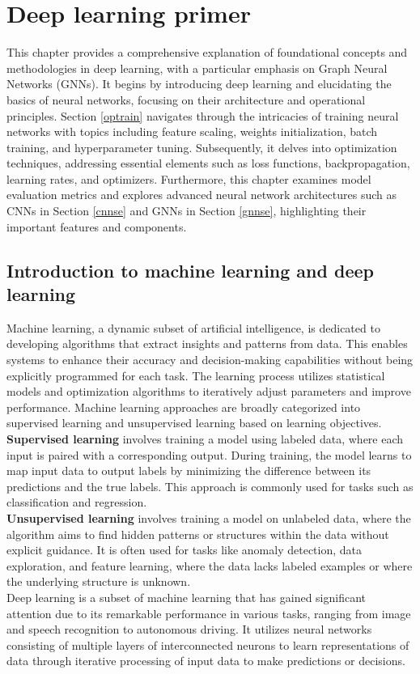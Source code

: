 \chapter{Deep learning primer}
\label{chap:Theory-Deep Learning}
This chapter provides a comprehensive explanation of foundational concepts and methodologies in deep learning, with a particular emphasis on Graph Neural Networks (GNNs). It begins by introducing deep learning and elucidating the basics of neural networks, focusing on their architecture and operational principles. Section \ref{optrain} navigates through the intricacies of training neural networks with topics including feature scaling, weights initialization, batch training, and hyperparameter tuning. Subsequently, it delves into optimization techniques, addressing essential elements such as loss functions, backpropagation, learning rates, and optimizers. Furthermore, this chapter examines model evaluation metrics and explores advanced neural network architectures such as CNNs in Section \ref{cnnse} and GNNs in Section \ref{gnnse}, highlighting their important features and components. 
\section{Introduction to machine learning and deep learning}
Machine learning, a dynamic subset of artificial intelligence, is dedicated to developing algorithms that extract insights and patterns from data. This enables systems to enhance their accuracy and decision-making capabilities without being explicitly programmed for each task. The learning process utilizes statistical models and optimization algorithms to iteratively adjust parameters and improve performance. Machine learning approaches are broadly categorized into supervised learning and unsupervised learning based on learning objectives. \\
\textbf{Supervised learning} involves training a model using labeled data, where each input is paired with a corresponding output. During training, the model learns to map input data to output labels by minimizing the difference between its predictions and the true labels. This approach is commonly used for tasks such as classification and regression. \\
\textbf{Unsupervised learning} involves training a model on unlabeled data, where the algorithm aims to find hidden patterns or structures within the data without explicit guidance. It is often used for tasks like anomaly detection, data exploration, and feature learning, where the data lacks labeled examples or where the underlying structure is unknown. \\
Deep learning is a subset of machine learning that has gained significant attention due to its remarkable performance in various tasks, ranging from image and speech recognition to autonomous driving. It utilizes neural networks consisting of multiple layers of interconnected neurons to learn representations of data through iterative processing of input data to make predictions or decisions. 
